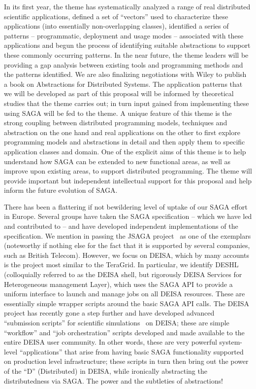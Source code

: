 \documentclass[10pt,letterpaper]{article}
\begin{document}
In its first year, the theme has systematically analyzed a range of
real distributed scientific applications, defined a set of ``vectors''
used to characterize these applications (into essentially
non-overlapping classes), identified a series of patterns --
programmatic, deployment and usage modes -- associated with these
applications and begun the process of identifying suitable
abstractions to support these commonly occurring patterns.  In the
near future, the theme leaders will be providing a gap analysis
between existing tools and programming methods and the patterns
identified. We are also finalizing negotiations with Wiley to publish
a book on Abstractions for Distributed Systems.  The application
patterns that we will be developed as part of this proposal will be
informed by theoretical studies that the theme carries out; in turn
input gained from implementing these using SAGA will be fed to the
theme.  A unique feature of this theme is the strong coupling between
distributed programming models, techniques and abstraction on the one
hand and real applications on the other to first explore programming
models and abstractions in detail and then apply them to specific
application classes and domain.  One of the explicit aims of this
theme is to help understand how SAGA can be extended to new functional
areas, as well as improve upon existing areas, to support distributed
programming. The theme will provide important but independent
intellectual support for this proposal and help inform the future
evolution of SAGA.

 There has been a flattering if not
bewildering level of uptake of our SAGA effort in Europe.  Several
groups have taken the SAGA specification -- which we have led and
contributed to -- and have developed independent implementations of
the specification. We mention in passing the JSAGA project~\cite{jsaga}
as one of the exemplars (noteworthy if nothing else for the fact that it
is supported by several companies, such as British Telecom). However,
we focus on DEISA, which by many accounts is the project most similar
to the TeraGrid.  In particular, we identify DESHL~\cite{deshl_url}
(colloquially referred to as the DEISA shell, but rigorously DEISA
Services for Heterogeneous management Layer), which uses the SAGA API
to provide a uniform interface to launch and manage jobs on all DEISA
resources. These are essentially simple wrapper scripts around the
basic SAGA API calls. The DEISA project has recently gone a step
further and have developed advanced ``submission scripts'' for
scientific simulations~\cite{ssss_deisa} on DEISA; these are simple
``workflow'' and ``job orchestration'' scripts developed and made
available to the entire DEISA user community. In other words, these
are very powerful system-level ``applications'' that arise from having
basic SAGA functionality supported on production level infrastructure;
these scripts in turn then bring out the power of the ``D''
(Distributed) in DEISA, while ironically abstracting the
distributedness via SAGA.  The power and the subtleties of
abstractions!
\end{document}

